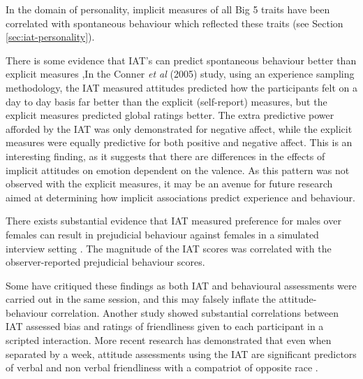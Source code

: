 In the domain of personality, implicit measures of all Big 5 traits have been correlated with spontaneous behaviour which reflected these traits \cite{Steffens2006} (see Section \ref{sec:iat-personality}). 

There is some evidence that IAT's can predict spontaneous behaviour better than explicit measures \cite{Conner2005,Perugini2005,Grumm2007} ,In the Conner \textit{et al} (2005) study, using an experience sampling methodology, the IAT measured attitudes predicted how the participants felt on a day to day basis far better than the explicit (self-report) measures, but the explicit measures predicted global ratings better. The extra predictive power afforded by the IAT  was only demonstrated for negative affect,  while the explicit measures were equally predictive for both positive and negative affect.  This is an interesting finding, as it suggests that there are differences in the effects of implicit attitudes on emotion dependent on the valence. As this pattern was not observed with the explicit measures, it may be an avenue for future research aimed at determining how implicit associations predict experience and behaviour. 


There exists substantial evidence that IAT measured preference for males over females  can result in prejudicial behaviour against females in a simulated interview setting \cite{Greenwald2000,Heider2007}. The magnitude of the IAT scores was correlated with the observer-reported prejudicial behaviour scores. 

Some have critiqued these findings as both IAT and behavioural assessments were carried out in the same session, and this may falsely inflate the attitude-behaviour correlation. Another study \cite{McConnell2001} showed substantial correlations between IAT assessed bias and ratings of friendliness given to each participant in a scripted interaction. More recent research has demonstrated that even when separated by a week, attitude assessments using the IAT are significant predictors of verbal and non verbal friendliness with a compatriot of opposite race \cite{Heider2007}. 

